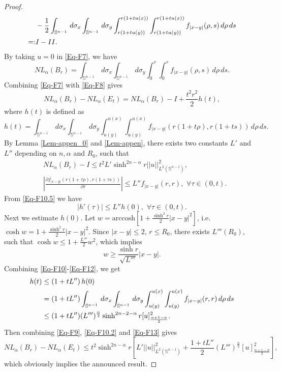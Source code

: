 \documentclass[10pt,a4paper]{amsart}
\begin{document}
\begin{proof}
\begin{align}
	&-\frac{1}{2}\int_{\mathbb{S}^{n-1}}\,d\sigma_x\int_{\mathbb{S}^{n-1}}\,d\sigma_y\int_{r(1+tu(y))}^{r(1+tu(x))}\int_{r(1+tu(y))}^{r(1+tu(x))}{f_{|x-y|}(\rho,s)}\,d\rho\,ds\notag\\
	=:&I-II.\label{Eq-F7}
\end{align}
By taking $u=0$ in \eqref{Eq-F7}, we have
\begin{equation}\label{Eq-F8}
	NL_{\alpha}(B_r)=\int_{\mathbb{S}^{n-1}}\,d\sigma_x\int_{\mathbb{S}^{n-1}}\,d\sigma_y\int_0^{r}\int_0^{r}{f_{|x-y|}(\rho,s)}\,d\rho\,ds.
\end{equation}
Combining \eqref{Eq-F7} with \eqref{Eq-F8} gives
\begin{equation}\label{Eq-F9}
		NL_{\alpha}(B_r)-NL_{\alpha}(E_t)=NL_{\alpha}(B_r)-I+\frac{t^2 r^2}{2}h(t),
\end{equation}
where $h(t)$ is defined as 
\begin{equation}\label{Eq-F10}
	h(t)=\int_{\mathbb{S}^{n-1}}\,d\sigma_x\int_{\mathbb{S}^{n-1}}\,d\sigma_y\int_{u(y)}^{u(x)}\int_{u(y)}^{u(x)}{f_{|x-y|}(r(1+t\rho),r(1+ts))}\,d\rho\,ds.
\end{equation}
By Lemma \ref{Lem-appen_0} and \ref{Lem-appen}, there exists two constants $L'$ and $L''$ depending on $n,\alpha$ and $R_0$, such that  
\begin{align}
	&NL_{\alpha}(B_r)-I\leq t^2L' \sinh^{2n-\alpha}r||u||^2_{L^2(\mathbb{S}^{n-1})},\label{Eq-F10.2}\\
	&\left|\frac{\partial f_{|x-y|}(r(1+\tau\rho),r(1+\tau s))}{\partial\tau}\right|\leq L''f_{|x-y|}(r,r),\,\,\forall\tau\in(0,t)\label{Eq-F10.5}.
\end{align}
From \eqref{Eq-F10.5} we have
\begin{equation}\label{Eq-F11}
	|h'(\tau)|\leq L''h(0),\,\,\forall\tau\in(0,t).
\end{equation}
Next we estimate $h(0)$. Let $w=\mathrm{arccosh}\left[1+\frac{\sinh^2 r}{2}|x-y|^2\right]$, i.e. $\cosh w=1+\frac{\sinh^2 r}{2}|x-y|^2$. Since $|x-y|\leq 2$, $r\leq R_0$, there exists $L'''(R_0)$, such that $\cosh w\leq 1+\frac{L'''}{2}w^2$, which implies
\begin{equation}\label{Eq-F12}
	w\geq\frac{\sinh r}{\sqrt{L'''}}|x-y|.
\end{equation}
Combining \eqref{Eq-F10}-\eqref{Eq-F12}, we get
\begin{align}
	h(t)&\leq \left(1+tL''\right)h(0)\notag\\
	&=(1+tL'')\int_{\mathbb{S}^{n-1}}\,d\sigma_x\int_{\mathbb{S}^{n-1}}\,d\sigma_y\int_{u(y)}^{u(x)}\int_{u(y)}^{u(x)}{f_{|x-y|}(r,r)}\,d\rho\,ds\notag\\
	&\leq (1+tL'')(L''')^{\frac{\alpha}{2}}\sinh^{2n-2-\alpha} r [u]^2_{\frac{\alpha+1-n}{2}}.\label{Eq-F13}
\end{align}
Then combining \eqref{Eq-F9}, \eqref{Eq-F10.2} and \eqref{Eq-F13} gives
\begin{equation}
	NL_{\alpha}(B_r)-NL_{\alpha}(E_t)\leq t^2\sinh^{2n-\alpha} r\left[L'||u||^2_{L^2(\mathbb{S}^{n-1})}+\frac{1+tL''}{2}(L''')^{\frac{\alpha}{2}}[u]^2_{\frac{\alpha+1-n}{2}}\right],
\end{equation}
which obviously implies the announced result.
\end{proof}
\end{document}
